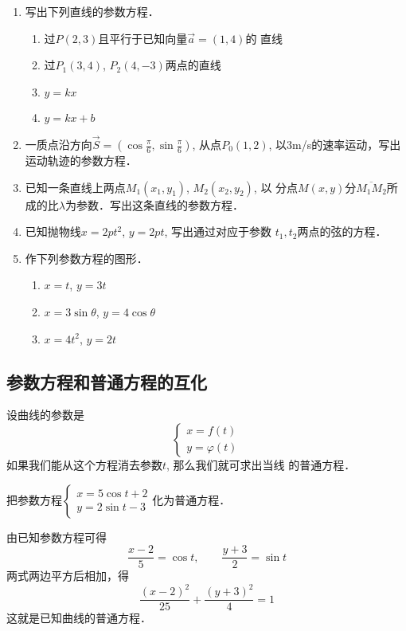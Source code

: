 \begin{ex}
\begin{enumerate}
    \item 写出下列直线的参数方程．
\begin{enumerate}
    \item 过$P(2,3)$且平行于已知向量$\vec{a}=(1,4)$的
    直线
    \item 过$P_1(3,4)$, $P_2(4,-3)$两点的直线
    \item $y=kx$
    \item $y=kx+b$
\end{enumerate}
\item 一质点沿方向$\vec{S}=\left(\cos\frac{\pi}{6},\sin\frac{\pi}{6}\right)$, 
从点$P_0(1,2)$, 
以3m/s的速率运动，写出运动轨迹的参数方程．
\item 已知一条直线上两点$M_1(x_1,y_1)$, $M_2(x_2,y_2)$, 以
分点$M(x,y)$分$\overline{M_1M_2}$所成的比$\lambda$为参数．写出这条直线的参数方程．
\item 已知抛物线$x=2pt^2$, $y=2pt$, 写出通过对应于参数
$t_1,t_2$两点的弦的方程．
\item 作下列参数方程的图形．
\begin{enumerate}
\item $x=t$, $y=3t$
\item $x=3\sin\theta$, $y=4\cos\theta$
\item $x=4t^2$, $y=2t$
\end{enumerate}
\end{enumerate}
\end{ex}

\subsection{参数方程和普通方程的互化}
设曲线的参数是
\[\begin{cases}
   x=f(t)\\
y=\varphi(t) 
\end{cases}\]
如果我们能从这个方程消去参数$t$, 那么我们就可求出当线
的普通方程．
 
\begin{example}
    把参数方程$\begin{cases}
        x=5\cos t+2\\
y=2\sin t-3
    \end{cases}$化为普通方程．
\end{example}

\begin{solution}
    由已知参数方程可得
\[\frac{x-2}{5}=\cos t,\qquad \frac{y+3}{2}=\sin t\]
两式两边平方后相加，得
\[\frac{(x-2)^2}{25}+\frac{(y+3)^2}{4}=1\]
这就是已知曲线的普通方程．
\end{solution}


